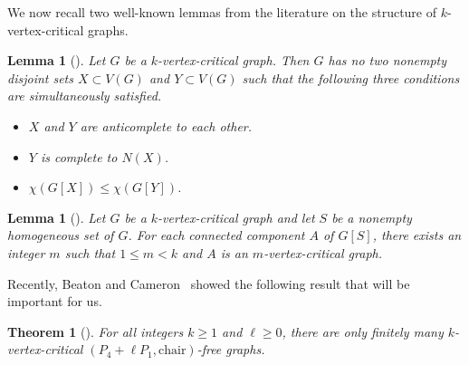 \documentclass[10pt]{article}
\newtheorem{theorem}[thm]{Theorem}
\newtheorem{lemma}[thm]{Lemma}
\theoremstyle{definition}
\begin{document}
We now recall two well-known lemmas from the literature on the structure of $k$-vertex-critical graphs.

\begin{lemma}[\cite{CGHS21}]
\label{lem:incompatible}
Let $G$ be a $k$-vertex-critical graph. Then $G$ has no two nonempty disjoint sets $X \subset V(G)$ and $Y \subset V(G)$ such that the following three conditions are simultaneously satisfied.
\begin{itemize}
    \item $X$ and $Y$ are anticomplete to each other.
    \item $Y$ is complete to $N(X)$.
    \item $\chi(G[X]) \leq \chi(G[Y])$.
\end{itemize}
\end{lemma}


\begin{lemma}[\cite{XJGH25b}]
\label{lem:homogeneous}
Let $G$ be a $k$-vertex-critical graph and let $S$ be a nonempty homogeneous set of $G$. For each connected component $A$ of $G[S]$, there exists an integer $m$ such that $1 \leq m<k$ and $A$ is an $m$-vertex-critical graph.  
\end{lemma}

Recently, Beaton and Cameron~\cite{BC26} showed the following result that will be important for us.

\begin{theorem}[\cite{BC26}]
\label{th:P4PlusLP1ChairFree}
    For all integers $k \geq 1$ and $\ell \geq 0$, there are only finitely many $k$-vertex-critical $(P_4+\ell P_1,\text{chair})$-free graphs.
\end{theorem}
\end{document}
